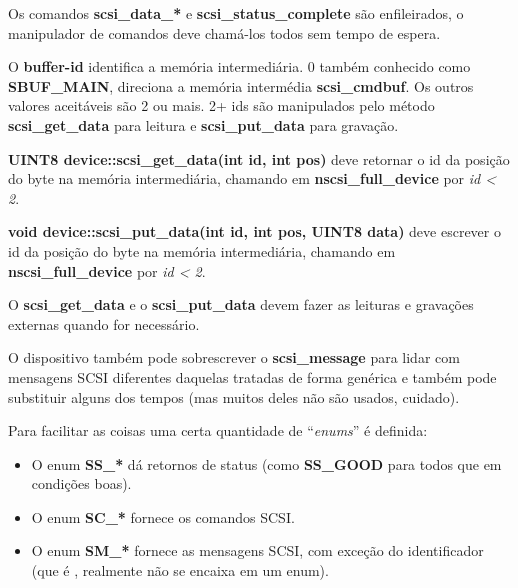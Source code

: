 \documentclass[letterpaper,10pt,brazil]{sphinxmanual}
\begin{document}
Os comandos \textbf{scsi\_data\_*} e \textbf{scsi\_status\_complete} são
enfileirados, o manipulador de comandos deve chamá-los todos sem
tempo de espera.

O \textbf{buffer-id} identifica a memória intermediária. 0 também conhecido
como \textbf{SBUF\_MAIN}, direciona a memória intermédia \textbf{scsi\_cmdbuf}.
Os outros valores aceitáveis são 2 ou mais. 2+ ids são manipulados pelo
método \textbf{scsi\_get\_data} para leitura e \textbf{scsi\_put\_data} para gravação.

\textbf{UINT8 device::scsi\_get\_data(int id, int pos)} deve retornar o id da
posição do byte na memória intermediária, chamando em
\textbf{nscsi\_full\_device} por \emph{id \textless{} 2}.

\textbf{void device::scsi\_put\_data(int id, int pos, UINT8 data)} deve
escrever o id da posição do byte na memória intermediária, chamando em
\textbf{nscsi\_full\_device} por \emph{id \textless{} 2}.

O \textbf{scsi\_get\_data} e o \textbf{scsi\_put\_data} devem fazer as leituras e
gravações externas quando for necessário.

O dispositivo também pode sobrescrever o \textbf{scsi\_message} para lidar com
mensagens SCSI diferentes daquelas tratadas de forma genérica e também
pode substituir alguns dos tempos (mas muitos deles não são usados,
cuidado).

Para facilitar as coisas uma certa quantidade de ``\emph{enums}'' é definida:
\begin{itemize}
\item {} 
O enum \textbf{SS\_*} dá retornos de status (como \textbf{SS\_GOOD} para todos
que em condições boas).

\item {} 
O enum \textbf{SC\_*} fornece os comandos SCSI.

\item {} 
O enum \textbf{SM\_*} fornece as mensagens SCSI, com exceção do
identificador (que é , realmente não se encaixa em um enum).

\end{itemize}
\end{document}
